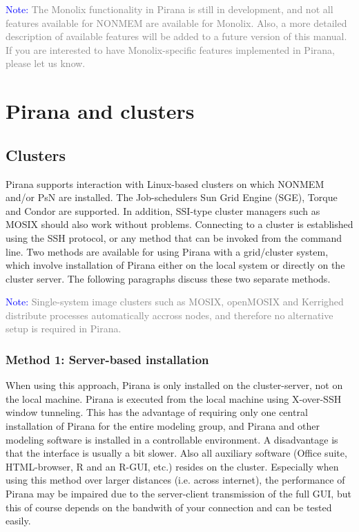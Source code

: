 {{{{\vspace{10pt}
\noindent\scriptsize \textcolor{Blue}{Note:} \textcolor{Grey} {
The Monolix functionality in Pirana is still in development, and not all features available for NONMEM are available for Monolix. Also, a more detailed description of available features will be added to a future version of this manual. 
If you are interested to have Monolix-specific features implemented in Pirana, please let us know.}
\normalsize

\chapter{Pirana and clusters}

\section{Clusters} Pirana supports interaction with Linux-based
clusters on which NONMEM and/or PsN are installed. The Job-schedulers
Sun Grid Engine (SGE), Torque and Condor are supported. In addition,
SSI-type cluster managers such as MOSIX should also work without
problems. Connecting to a cluster is established using the SSH
protocol, or any method that can be invoked from the command line. Two
methods are available for using Pirana with a grid/cluster system,
which involve installation of Pirana either on the local system or
directly on the cluster server. The following paragraphs discuss these
two separate methods.

\vspace{10pt}
\noindent\scriptsize \textcolor{Blue}{Note:} \textcolor{Grey} {Single-system image clusters such as MOSIX, openMOSIX and
Kerrighed distribute processes automatically accross nodes, and therefore no alternative setup is required in Pirana.}
\normalsize

\subsection{Method 1: Server-based installation}
When using this approach, Pirana is only installed on the
cluster-server, not on the local machine. Pirana is executed from the
local machine using X-over-SSH window tunneling. This has the
advantage of requiring only one central installation of Pirana for the
entire modeling group, and Pirana and other modeling software is
installed in a controllable environment. A disadvantage is that the
interface is usually a bit slower. Also all auxiliary software (Office
suite, HTML-browser, R and an R-GUI, etc.) resides on the
cluster. Especially when using this method over larger distances
(i.e. across internet), the performance of Pirana may be impaired due
to the server-client transmission of the full GUI, but this of course
depends on the bandwith of your connection and can be tested easily.\\

}}}}
